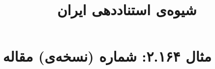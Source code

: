 \documentclass[a4paper,10pt]{article}
\begin{document}
\title{شیوه‌ی استناددهی ایران
 }
\author{}
\date{}
\maketitle



\section*{مثال ۲.۱۶۴: شماره (نسخه‌ی) مقاله}

\cite{حیاتی1382}\\
\cite{muldoon1987}\\






\end{document}
